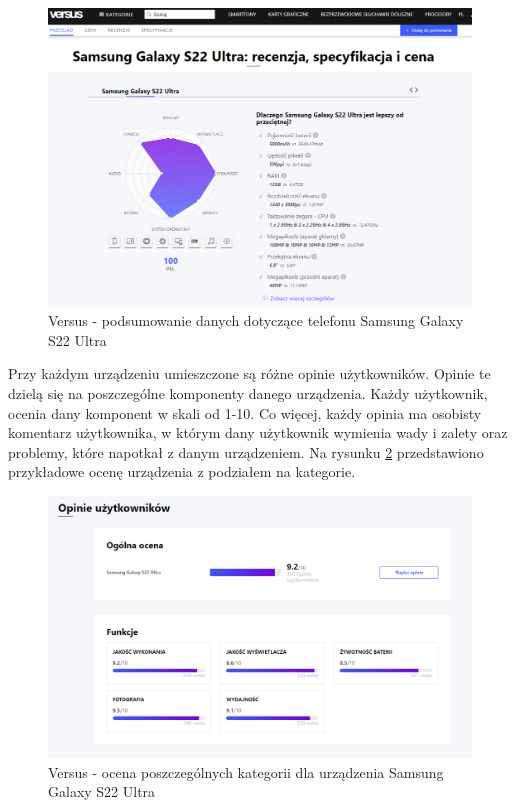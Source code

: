\begin{figure}[ht]
    \centering
    \includegraphics[scale=0.45]{img/versus/versusDetails.png}
    \caption{Versus - podsumowanie danych dotyczące telefonu Samsung Galaxy S22 Ultra}
    \label{versus_2}
\end{figure}
Przy każdym urządzeniu umieszczone są różne opinie użytkowników. Opinie te dzielą się na poszczególne komponenty danego urządzenia. Każdy użytkownik, ocenia dany komponent w skali od 1-10. Co więcej, każdy opinia ma osobisty komentarz użytkownika, w którym dany użytkownik wymienia wady i zalety oraz problemy, które napotkał z danym urządzeniem.
Na rysunku \ref*{versus_3} przedstawiono przykładowe ocenę urządzenia z podziałem na kategorie.
\begin{figure}[H]
    \centering
    \includegraphics[scale=0.45]{img/versus/versusOpinie.png}
    \caption{Versus - ocena poszczególnych kategorii dla urządzenia Samsung Galaxy S22 Ultra}
    \label{versus_3}
\end{figure}
